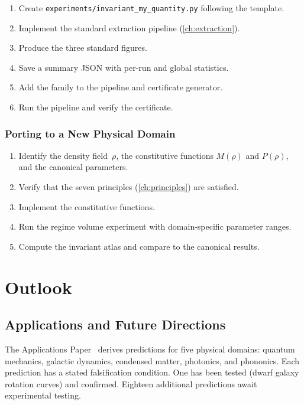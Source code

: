\documentclass[11pt,twoside,openright]{book}
\theoremstyle{definition}
\theoremstyle{plain}
\theoremstyle{definition}
\theoremstyle{remark}
\begin{document}
\begin{enumerate}
\item Create \texttt{experiments/invariant\_my\_quantity.py} following the template.
\item Implement the standard extraction pipeline (\cref{ch:extraction}).
\item Produce the three standard figures.
\item Save a summary JSON with per-run and global statistics.
\item Add the family to the pipeline and certificate generator.
\item Run the pipeline and verify the certificate.
\end{enumerate}

\section{Porting to a New Physical Domain}

\begin{enumerate}
\item Identify the density field~\(\rho\), the constitutive functions \(M(\rho)\) and \(P(\rho)\), and the canonical parameters.
\item Verify that the seven principles (\cref{ch:principles}) are satisfied.
\item Implement the constitutive functions.
\item Run the regime volume experiment with domain-specific parameter ranges.
\item Compute the invariant atlas and compare to the canonical results.
\end{enumerate}


\part{Outlook}\label{part:outlook}

\chapter{Applications and Future Directions}\label{ch:applications}

The Applications Paper~\cite{applications} derives predictions for five physical domains: quantum mechanics, galactic dynamics, condensed matter, photonics, and phononics. Each prediction has a stated falsification condition. One has been tested (dwarf galaxy rotation curves) and confirmed. Eighteen additional predictions await experimental testing.
\end{document}
